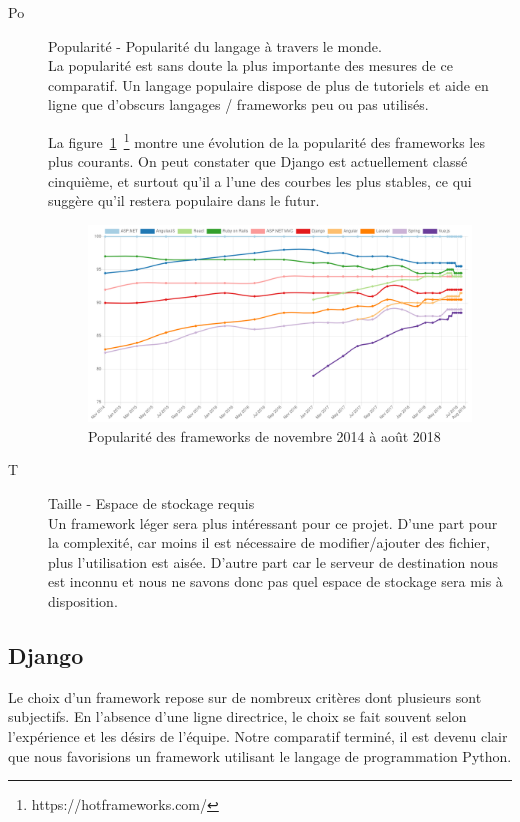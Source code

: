 \documentclass{EPL-master-thesis-covers-FR}
\begin{document}
\begin{description}
					\item[Po] Popularité - Popularité du langage à travers le monde. \hfill \\
							La popularité est sans doute la plus importante des mesures de ce comparatif. Un langage populaire dispose de plus de tutoriels et aide en ligne que d'obscurs langages / frameworks peu ou pas utilisés.

							La figure~\ref{fig:hotframework}~\footnote{https://hotframeworks.com/} montre une évolution de la popularité des frameworks les plus courants. On peut constater que Django est actuellement classé cinquième, et surtout qu'il a l'une des courbes les plus stables, ce qui suggère qu'il restera populaire dans le futur.

							\begin{figure}
								\centering
								\includegraphics[width=\textwidth]{images/hotframework.png}
								\caption{Popularité des frameworks de novembre 2014 à août 2018}
								\label{fig:hotframework}
							\end{figure}
					\item[T] Taille - Espace de stockage requis \hfill \\
							Un framework léger sera plus intéressant pour ce projet. D'une part pour la complexité, car moins il est nécessaire de modifier/ajouter des fichier, plus l'utilisation est aisée. D'autre part car le serveur de destination nous est inconnu et nous ne savons donc pas quel espace de stockage sera mis à disposition.
				\end{description}


				\subsection*{Django}
					Le choix d'un framework repose sur de nombreux critères dont plusieurs sont subjectifs. En l'absence d'une ligne directrice, le choix se fait souvent selon l'expérience et les désirs de l'équipe. Notre comparatif terminé, il est devenu clair que nous favorisions un framework utilisant le langage de programmation Python.
\end{document}
